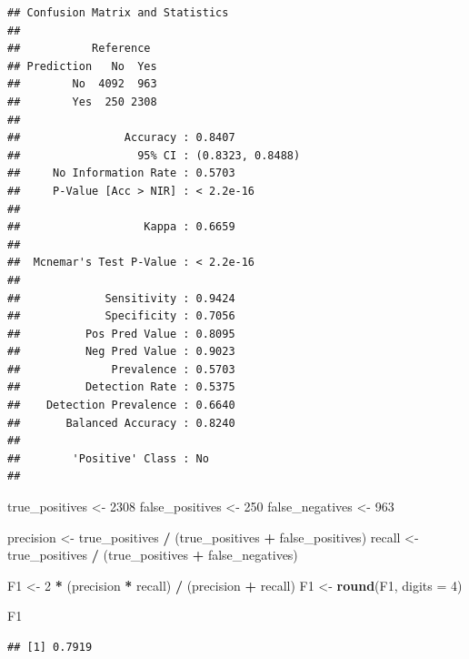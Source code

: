 \documentclass[]{article}
\newenvironment{Shaded}{\begin{snugshade}}{\end{snugshade}}
\newcommand{\DataTypeTok}[1]{\textcolor[rgb]{0.13,0.29,0.53}{#1}}
\newcommand{\DecValTok}[1]{\textcolor[rgb]{0.00,0.00,0.81}{#1}}
\newcommand{\KeywordTok}[1]{\textcolor[rgb]{0.13,0.29,0.53}{\textbf{#1}}}
\newcommand{\NormalTok}[1]{#1}
\newcommand{\OperatorTok}[1]{\textcolor[rgb]{0.81,0.36,0.00}{\textbf{#1}}}
\newcommand{\StringTok}[1]{\textcolor[rgb]{0.31,0.60,0.02}{#1}}
\begin{document}
\begin{verbatim}
## Confusion Matrix and Statistics
## 
##           Reference
## Prediction   No  Yes
##        No  4092  963
##        Yes  250 2308
##                                           
##                Accuracy : 0.8407          
##                  95% CI : (0.8323, 0.8488)
##     No Information Rate : 0.5703          
##     P-Value [Acc > NIR] : < 2.2e-16       
##                                           
##                   Kappa : 0.6659          
##                                           
##  Mcnemar's Test P-Value : < 2.2e-16       
##                                           
##             Sensitivity : 0.9424          
##             Specificity : 0.7056          
##          Pos Pred Value : 0.8095          
##          Neg Pred Value : 0.9023          
##              Prevalence : 0.5703          
##          Detection Rate : 0.5375          
##    Detection Prevalence : 0.6640          
##       Balanced Accuracy : 0.8240          
##                                           
##        'Positive' Class : No              
## 
\end{verbatim}

\begin{Shaded}
\begin{Highlighting}[]
\NormalTok{true_positives <-}\StringTok{ }\DecValTok{2308}
\NormalTok{false_positives <-}\StringTok{ }\DecValTok{250}
\NormalTok{false_negatives <-}\StringTok{ }\DecValTok{963}

\NormalTok{precision <-}\StringTok{ }\NormalTok{true_positives }\OperatorTok{/}\StringTok{ }\NormalTok{(true_positives }\OperatorTok{+}\StringTok{ }\NormalTok{false_positives)}
\NormalTok{recall <-}\StringTok{ }\NormalTok{true_positives }\OperatorTok{/}\StringTok{ }\NormalTok{(true_positives }\OperatorTok{+}\StringTok{ }\NormalTok{false_negatives)}

\NormalTok{F1 <-}\StringTok{ }\DecValTok{2} \OperatorTok{*}\StringTok{ }\NormalTok{(precision }\OperatorTok{*}\StringTok{ }\NormalTok{recall) }\OperatorTok{/}\StringTok{ }\NormalTok{(precision }\OperatorTok{+}\StringTok{ }\NormalTok{recall)}
\NormalTok{F1 <-}\StringTok{ }\KeywordTok{round}\NormalTok{(F1, }\DataTypeTok{digits =} \DecValTok{4}\NormalTok{)}

\NormalTok{F1}
\end{Highlighting}
\end{Shaded}

\begin{verbatim}
## [1] 0.7919
\end{verbatim}
\end{document}
